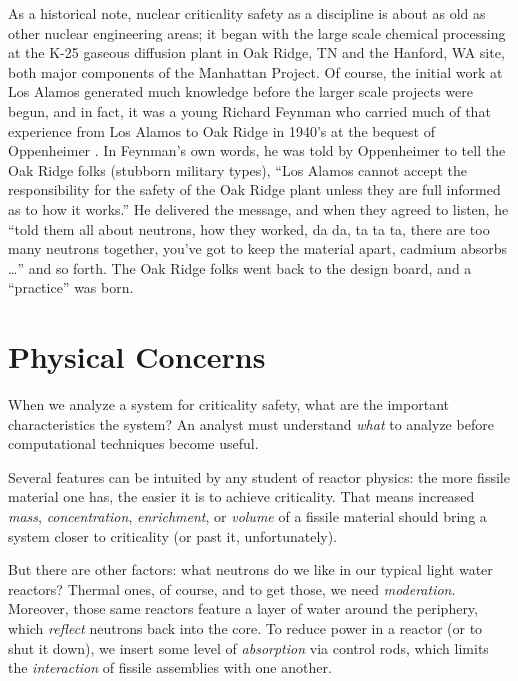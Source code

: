 As a historical note, nuclear criticality safety as a discipline is 
about as old as other nuclear 
engineering areas; it began with the large scale chemical processing at
the K-25 gaseous diffusion plant in Oak Ridge, TN and the Hanford, WA site, 
both major components of the 
Manhattan Project.  Of course, the initial work at Los Alamos generated 
much knowledge before the larger scale projects were begun, and in fact, 
it was a young Richard Feynman who carried much of that experience from 
Los Alamos to Oak Ridge in 1940's at the bequest of Oppenheimer 
\cite{feynman1985syj}. In Feynman's own words, he was told by Oppenheimer to
tell the Oak Ridge folks (stubborn military types), ``Los Alamos cannot 
accept the responsibility
for the safety of the Oak Ridge plant unless they are full informed as
to how it works.''  He delivered the message, and when they agreed to 
listen, he
``told them all about neutrons, how they worked, da da, ta ta ta,
there are too many neutrons together, you've got to keep the material
apart, cadmium absorbs \ldots'' and so forth.  The Oak Ridge folks
went back to the design board, and a ``practice'' was born.


\section*{Physical Concerns}

When we analyze a system for criticality safety, what are the important 
characteristics the system?  An analyst must understand \textit{what} to
analyze before computational techniques become useful.

Several features can be intuited by any
student of reactor physics: the more fissile material one has, the easier
it is to achieve criticality.  That means increased 
\textit{mass}, \textit{concentration}, \textit{enrichment}, or 
\textit{volume} of a fissile material should bring
a system closer to criticality (or past it, unfortunately).

But there are other factors: what neutrons do we like in our typical light
water reactors?  Thermal ones, of course, and to get those, we need 
\textit{moderation}.  Moreover, those same reactors feature a layer of
water around the periphery, which \textit{reflect} neutrons back into
the core.  To reduce power in a reactor (or to shut it down), we insert
some level of \textit{absorption} via control rods, which limits
the \textit{interaction} of fissile assemblies with one another. 

